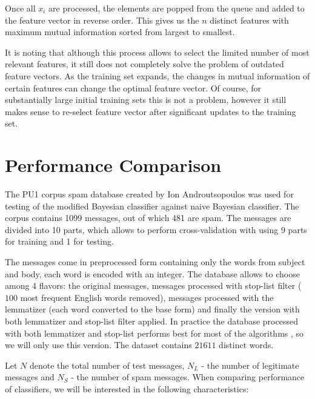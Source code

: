 \documentclass[12pt]{report}
\begin{document}
Once all $x_i$ are processed, the elements are popped from the queue and added to the feature vector in reverse order. This gives us the $n$ distinct features with maximum mutual information sorted from largest to smallest.

It is noting that although this process allows to select the limited number of most relevant features, it still does not completely solve the problem of outdated feature vectors. As the training set expands, the changes in mutual information of certain features can change the optimal feature vector. Of course, for substantially large initial training sets this is not a problem, however it still makes sense to re-select feature vector after significant updates to the training set.

\newpage


\chapter{Performance Comparison}

The PU1 corpus spam database created by Ion Androutsopoulos \cite{Androutsopoulos} was used for testing of the modified Bayesian classifier against naive Bayesian classifier. The corpus contains 1099 messages, out of which 481 are spam. The messages are divided into 10 parts, which allows to perform cross-validation with using 9 parts for training and 1 for testing.

The messages come in preprocessed form containing only the words from subject and body, each word is encoded with an integer. The database allows to choose among 4 flavors: the original messages, messages processed with stop-list filter ($100$ most frequent English words removed), messages processed with the  lemmatizer (each word converted to the base form) and finally the version with both lemmatizer and stop-list filter applied. In practice the database processed with both lemmatizer and stop-list performs best for most of the algorithms \cite{Tretyakov}, so we will only use this version. The dataset contains $21611$ distinct words.

Let $N$ denote the total number of test messages, $N_L$ - the number of legitimate messages and $N_S$ - the number of spam messages. When comparing performance of classifiers, we will be interested in the following characteristics:
\end{document}
